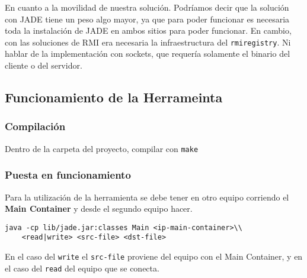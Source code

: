 En cuanto a la movilidad de nuestra solución. Podríamos decir que la solución con JADE tiene un peso algo mayor, ya que para poder funcionar es necesaria toda la instalación de JADE en ambos sitios para poder funcionar. En cambio, con las soluciones de RMI era necesaria la infraestructura del \texttt{rmiregistry}. Ni hablar de la implementación con sockets, que requería solamente el binario del cliente o del servidor.

\subsection{Funcionamiento de la Herrameinta}

\subsubsection{Compilación}

Dentro de la carpeta del proyecto, compilar con \texttt{make} 

\subsubsection{Puesta en funcionamiento}

Para la utilización de la herramienta se debe tener en otro equipo corriendo el \textbf{Main Container} y desde el segundo equipo hacer.

\begin{lstlisting}[breaklines=true]
java -cp lib/jade.jar:classes Main <ip-main-container>\\
    <read|write> <src-file> <dst-file>
\end{lstlisting}

En el caso del \texttt{write} el \texttt{src-file} proviene del equipo con el Main Container, y en el caso del \texttt{read} del equipo que se conecta.


\clearpage
\printbibliography


